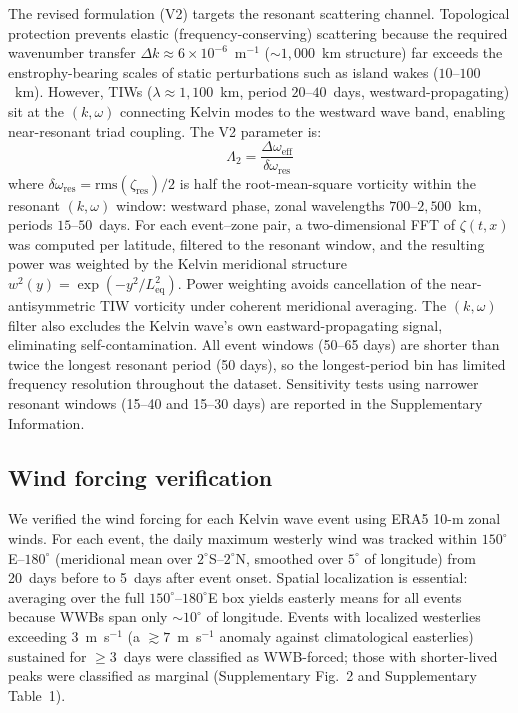 \documentclass[11pt]{article}
\begin{document}
The revised formulation (V2) targets the resonant scattering channel. Topological protection prevents elastic (frequency-conserving) scattering because the required wavenumber transfer $\Delta k \approx 6 \times 10^{-6}$~m$^{-1}$ (${\sim}1{,}000$~km structure) far exceeds the enstrophy-bearing scales of static perturbations such as island wakes ($10$--$100$~km). However, TIWs ($\lambda \approx 1{,}100$~km, period $20$--$40$~days, westward-propagating) sit at the $(k, \omega)$ connecting Kelvin modes to the westward wave band, enabling near-resonant triad coupling\cite{Lyman2005}. The V2 parameter is:
\begin{equation}
\Lambda_2 = \frac{\Delta\omega_\mathrm{eff}}{\delta\omega_\mathrm{res}}
\label{eq:lambda2}
\end{equation}
where $\delta\omega_\mathrm{res} = \mathrm{rms}(\zeta_\mathrm{res}) / 2$ is half the root-mean-square vorticity within the resonant $(k, \omega)$ window: westward phase, zonal wavelengths $700$--$2{,}500$~km, periods $15$--$50$~days. For each event--zone pair, a two-dimensional FFT of $\zeta(t, x)$ was computed per latitude, filtered to the resonant window, and the resulting power was weighted by the Kelvin meridional structure $w^2(y) = \exp(-y^2 / L_\mathrm{eq}^2)$. Power weighting avoids cancellation of the near-antisymmetric TIW vorticity under coherent meridional averaging. The $(k, \omega)$ filter also excludes the Kelvin wave's own eastward-propagating signal, eliminating self-contamination. All event windows (50--65 days) are shorter than twice the longest resonant period (50 days), so the longest-period bin has limited frequency resolution throughout the dataset. Sensitivity tests using narrower resonant windows (15--40 and 15--30 days) are reported in the Supplementary Information.

\subsection{Wind forcing verification}

We verified the wind forcing for each Kelvin wave event using ERA5 10-m zonal winds. For each event, the daily maximum westerly wind was tracked within $150^\circ$E--$180^\circ$ (meridional mean over $2^\circ$S--$2^\circ$N, smoothed over $5^\circ$ of longitude) from 20~days before to 5~days after event onset. Spatial localization is essential: averaging over the full $150^\circ$--$180^\circ$E box yields easterly means for all events because WWBs span only ${\sim}10^\circ$ of longitude. Events with localized westerlies exceeding 3~m~s$^{-1}$ (a ${\gtrsim}7$~m~s$^{-1}$ anomaly against climatological easterlies) sustained for $\geq 3$~days were classified as WWB-forced; those with shorter-lived peaks were classified as marginal (Supplementary Fig.~2 and Supplementary Table~1).
\end{document}
